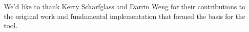 \documentclass[smallextended]{svjour3}       %
\begin{document}

\begin{acknowledgements}
We'd like to thank Kerry Scharfglass and Darrin Weng for their contributions
to the original work \cite{scharfglass2012breaking} and fundamental
implementation that formed the basis for the tool.
\end{acknowledgements}

%


\end{document}
